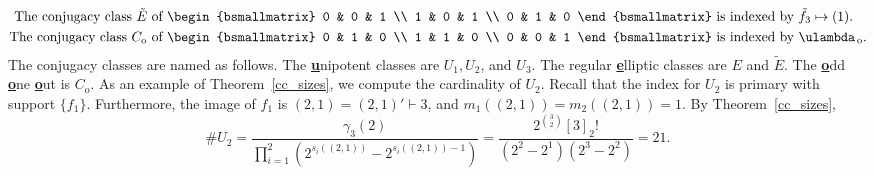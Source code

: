 \begin{example}
\begin{align*}
\text{The conjugacy class } \tilde{E} \text{ of }
\begin{bsmallmatrix}
0 & 0 & 1 \\
1 & 0 & 1 \\
0 & 1 & 0
\end{bsmallmatrix}
&
\text{ is indexed by }
\tilde{f}_3 \mapsto (1). \\
\text{The conjugacy class } C_{\mathrm{o}} \text{ of }
\begin{bsmallmatrix}
0 & 1 & 0 \\
1 & 1 & 0 \\
0 & 0 & 1
\end{bsmallmatrix}
&
\text{ is indexed by }
\ulambda_{\,\mathrm{o}}.
\end{align*}
The conjugacy classes are named as follows.
The \uline{\textbf{u}}nipotent classes are $U_1, U_2$, and $U_3$. The regular \uline{\textbf{e}}lliptic classes are $E$ and $\tilde{E}$. The \uline{\textbf{o}}dd \uline{\textbf{o}}ne \uline{\textbf{o}}ut is $C_{\mathrm{o}}$.
As an example of Theorem~\ref{cc_sizes}, we compute the cardinality of \(U_2\).
Recall that the index for \(U_2\) is primary with support \(\{f_1\}\).
Furthermore, the image of \(f_1\) is \((2,1) = (2,1)' \vdash 3\), and \(m_1((2,1)) = m_2((2,1)) = 1\).
By Theorem~\ref{cc_sizes},
\begin{equation}
\# U_2
=
\frac{\gamma_3(2)}{
\prod_{i = 1}^2
\left (
2^{s_i((2,1))}
-
2^{s_i((2,1)) - 1}
\right )
}
=
\frac{2^{\binom{3}{2}} [3]_2 !}{(2^2 - 2^1)(2^3 - 2^2)}
=
21.
\end{equation}

\end{example}










































